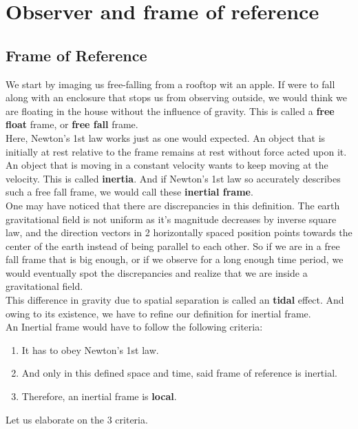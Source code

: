 \documentclass[11pt,letterpaper]{book}
\begin{document}
\section{Observer and frame of reference}

\subsection{Frame of Reference}
We start by imaging us free-falling from a rooftop wit an apple. If were to fall along with an enclosure that stops us from observing outside, we would think we are floating in the house without the influence of gravity. This is called a \textbf{free float} frame, or \textbf{free fall} frame.\\

Here, Newton's 1st law works just as one would expected. An object that is initially at rest relative to the frame remains at rest without force acted upon it. An object that is moving in a constant velocity wants to keep moving at the velocity. This is called \textbf{inertia}. And if Newton's 1st law so accurately describes such a free fall frame, we would call these \textbf{inertial frame}. 
\\

One may have noticed that there are discrepancies in this definition. The earth gravitational field is not uniform as it's magnitude decreases by inverse square law, and the direction vectors in 2 horizontally spaced position points towards the center of the earth instead of being parallel to each other. So if we are in a free fall frame that is big enough, or if we observe for a long enough time period, we would eventually spot the discrepancies and realize that we are inside a gravitational field. \\

This difference in gravity due to spatial separation is called an \textbf{tidal} effect. And owing to its existence, we have to refine our definition for inertial frame. \\

An Inertial frame would have to follow the following criteria:\\
\begin{enumerate}
    \item It has to obey Newton's 1st law.
    \item And only in this defined space and time, said frame of reference is inertial.
    \item Therefore, an inertial frame is \textbf{local}.
\end{enumerate}
Let us elaborate on the 3 criteria.\\
\end{document}

